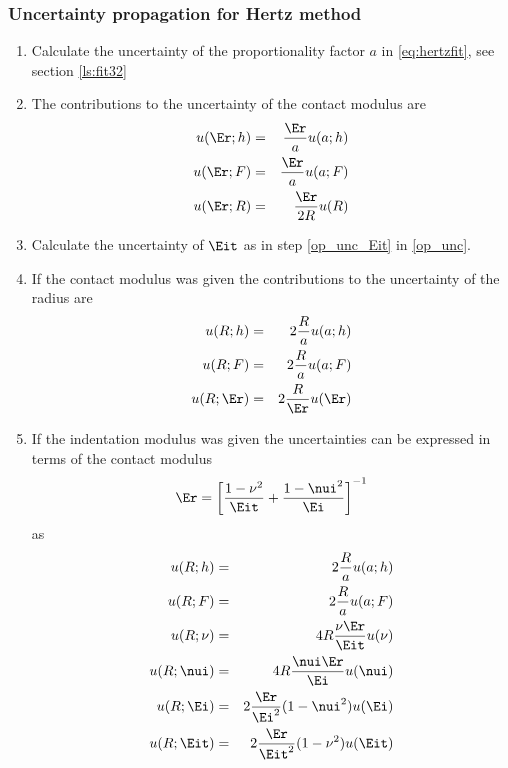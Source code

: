 
\subsubsection{Uncertainty propagation for Hertz method}\label{hertz_unc}
\begin{enumerate}
 \item 
 Calculate the uncertainty of the proportionality factor $a$ in \eqref{eq:hertzfit}, see section \ref{ls:fit32}
 
 \item
The contributions to the uncertainty of the contact modulus are
\begin{eqnarray*}
 u(\Er;h) &=&  \frac{\Er}{a} u(a;h)  \\
 u(\Er;F) &=&  \frac{\Er}{a} u(a;F)  \\ 
 u(\Er;R) &=&  \frac{\Er}{2 R} u(R) 
 \end{eqnarray*}
 
\item Calculate the uncertainty of $\Eit$ as in step \ref{op_unc_Eit} in \ref{op_unc}.
\item If the contact modulus was given the contributions to the uncertainty of the radius are
\begin{eqnarray*}
 u(R;h) &=&  2 \frac{R}{a} u(a;h) \\
 u(R;F) &=&  2 \frac{R}{a} u(a;F) \\ 
 u(R;\Er) &=& 2\frac{R}{\Er} u(\Er) 
 \end{eqnarray*}
 
\item \label{hertz_unc_Eit}
If the indentation modulus was given the uncertainties can be expressed in terms of the contact modulus
$$
\Er = \left[ \frac{1-\nu^2}{\Eit} + \frac{1-\nui^2}{\Ei} \right]^{-1}
$$
as
\begin{eqnarray*}
 u(R;h) &=&  2 \frac{R}{a} u(a;h) \\
 u(R;F) &=&  2 \frac{R}{a} u(a;F) \\
 u(R;\nu) &=&  4 R \frac{ \nu \Er }{\Eit} u(\nu)\\
 u(R;\nui) &=&  4  R \frac{ \nui \Er }{\Ei} u(\nui)\\
 u(R;\Ei) &=&  2 \frac{\Er}{\Ei^2} (1-\nui^2) u(\Ei)\\
 u(R;\Eit) &=& 2  \frac{\Er}{ \Eit^2} (1-\nu^2) u(\Eit)
\end{eqnarray*}

 \end{enumerate}

